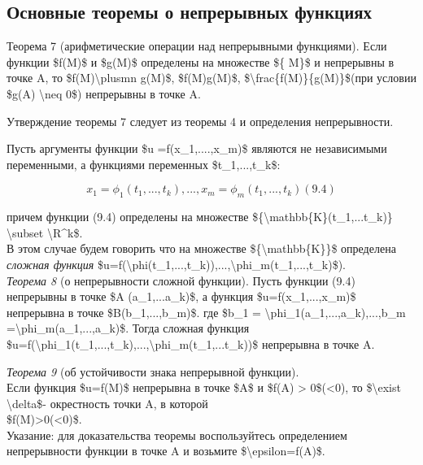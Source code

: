 \documentclass[
]{article}
\begin{document}
\hypertarget{ux43eux441ux43dux43eux432ux43dux44bux435-ux442ux435ux43eux440ux435ux43cux44b-ux43e-ux43dux435ux43fux440ux435ux440ux44bux432ux43dux44bux445-ux444ux443ux43dux43aux446ux438ux44fux445}{%
\subsection{Основные теоремы о непрерывных
функциях}\label{ux43eux441ux43dux43eux432ux43dux44bux435-ux442ux435ux43eux440ux435ux43cux44b-ux43e-ux43dux435ux43fux440ux435ux440ux44bux432ux43dux44bux445-ux444ux443ux43dux43aux446ux438ux44fux445}}

Теорема 7 (арифметические операции над непрерывными функциями). Если
функции \$f(M)\$ и \$g(M)\$ определены на множестве \$\{ M\}\$ и
непрерывны в точке A, то \$f(M)\textbackslash plusmn g(M)\$,
\$f(M)g(M)\$, \$\textbackslash frac\{f(M)\}\{g(M)\}\$(при условии \$g(A)
\textbackslash neq 0\$) непрерывны в точке A.

Утверждение теоремы 7 следует из теоремы 4 и определения непрерывности.

Пусть аргументы функции \$u =f(x\_1,....,x\_m)\$ являются не
независимыми переменными, а функциями переменных \$t\_1,...,t\_k\$:

\[x_1 = \phi_1(t_1,...,t_k),...,x_m = \phi_m(t_1,...,t_k) (9.4)\]

причем функции (9.4) определены на множестве
\$\{\textbackslash mathbb\{K\}(t\_1,...t\_k)\} \textbackslash subset
\textbackslash R\^{}k\$.\\
В этом случае будем говорить что на множестве
\$\{\textbackslash mathbb\{K\}\}\$ определена \emph{сложная функция}
\$u=f(\textbackslash phi(t\_1,...,t\_k)),...,\textbackslash phi\_m(t\_1,...,t\_k)\$).\\
\emph{Теорема 8} (о непрерывности сложной функции). Пусть функции (9.4)
непрерывны в точке \$A (a\_1,...a\_k)\$, а функция
\$u=f(x\_1,...,x\_m)\$ непрерывна в точке \$B(b\_1,...,b\_m)\$. где
\$b\_1 = \textbackslash phi\_1(a\_1,...,a\_k),...,b\_m
=\textbackslash phi\_m(a\_1,...,a\_k)\$. Тогда сложная функция
\$u=f(\textbackslash phi\_1(t\_1,...,t\_k),...,\textbackslash phi\_m(t\_1,...t\_k))\$
непрерывна в точке A.

\emph{Теорема 9} (об устойчивости знака непрерывной функции).\\
Если функция \$u=f(M)\$ непрерывна в точке \$A\$ и \$f(A) \textgreater{}
0\$(\textless0), то \$\textbackslash exist \textbackslash delta\$-
окрестность точки A, в которой\\
\$f(M)\textgreater0(\textless0)\$.\\
Указание: для доказательства теоремы воспользуйтесь определением
непрерывности функции в точке A и возьмите
\$\textbackslash epsilon=\textbar f(A)\textbar\$.
\end{document}
